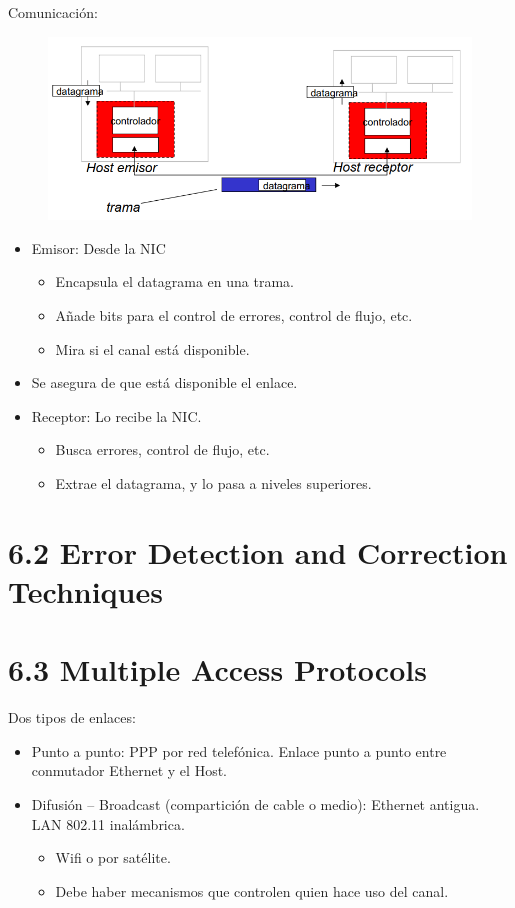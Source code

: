 \documentclass[12pt, twoside, openright]{report} %
\begin{document}
Comunicación:
\begin{figure}[H]
	{\includegraphics[scale=.35]{Untitled 47.png}}
\end{figure}
\begin{itemize}
	\item Emisor: Desde la NIC

	      \begin{itemize}
		      \item Encapsula el datagrama en una trama.
		      \item Añade bits para el control de errores, control de flujo, etc.
		      \item Mira si el canal está disponible.
	      \end{itemize}
	\item Se asegura de que está disponible el enlace.
	\item Receptor: Lo recibe la NIC.

	      \begin{itemize}
		      \item Busca errores, control de flujo, etc.
		      \item Extrae el datagrama, y lo pasa a niveles superiores.
	      \end{itemize}
\end{itemize}


\section{6.2 Error Detection and Correction Techniques}
\pagebreak
\section{6.3 Multiple Access Protocols}


Dos tipos de enlaces:

\begin{itemize}
	\item Punto a punto: PPP por red telefónica. Enlace punto a punto entre
	      conmutador Ethernet y el Host.
	\item Difusión -- Broadcast (compartición de cable o medio): Ethernet
	      antigua. LAN 802.11 inalámbrica.

	      \begin{itemize}
		      \item Wifi o por satélite.
		      \item Debe haber mecanismos que controlen quien hace uso del canal.
	      \end{itemize}
\end{itemize}
\end{document}
